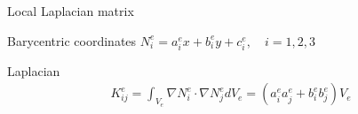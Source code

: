 \documentclass[handout]{beamer}
{
\usepackage{fullpage}
\usepackage{hyperref}
\usepackage{amssymb} 
}
\begin{document}
\begin{frame}{Local Laplacian matrix}
\centering
\begin{minipage}{0.65\textwidth}

\begin{block}{Barycentric coordinates}
$N_i^e = a^e_i x + b^e_i y + c^e_i, \quad i=1,2,3$
\end{block}

\begin{block}{Laplacian}
\begin{align*}
K_{ij}^e = \int_{V_e} \nabla N_i^e \cdot \nabla N_j^e d V_e = (a^e_i a^e_j + b^e_i b^e_j) V_e
\end{align*}
\end{block}
\end{minipage}
\end{frame}
\end{document}
